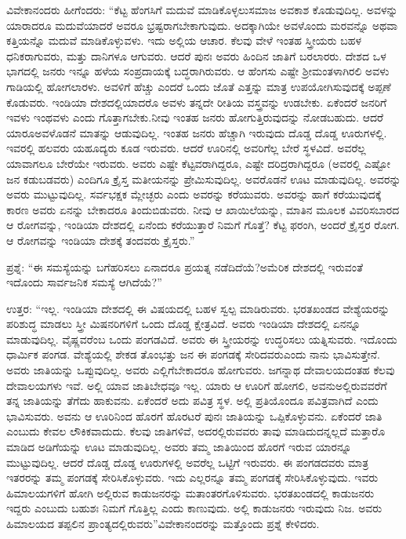 ವಿವೇಕಾನಂದರು ಹೀಗೆಂದರು: “ಕೆಟ್ಟ ಹೆಂಗಸಿಗೆ ಮದುವೆ ಮಾಡಿಕೊಳ್ಳಲು\break ಸಮಾಜ ಅವಕಾಶ ಕೊಡುವುದಿಲ್ಲ. ಅವಳನ್ನು ಯಾರಾದರೂ ಮದುವೆಯಾದರೆ ಅವರೂ ಭ್ರಷ್ಟರಾಗಬೇಕಾಗುವುದು. ಅದಕ್ಕಾಗಿಯೇ ಅವಳೊಂದು ಮರವನ್ನೊ ಅಥವಾ ಕತ್ತಿಯನ್ನೊ ಮದುವೆ ಮಾಡಿಕೊಳ್ಳುವಳು. ಇದು ಅಲ್ಲಿಯ ಆಚಾರ. ಕೆಲವು ವೇಳೆ ಇಂತಹ ಸ್ತ್ರೀಯರು ಬಹಳ ಧನಿಕರಾಗುವರು, ಮತ್ತು ದಾನಿಗಳೂ ಆಗುವರು. ಆದರೆ ಪುನಃ ಅವರು ಹಿಂದಿನ ಜಾತಿಗೆ ಬರಲಾರರು. ದೇಶದ ಒಳ ಭಾಗದಲ್ಲಿ ಜನರು ಇನ್ನೂ ಹಳೆಯ ಸಂಪ್ರದಾಯಕ್ಕೆ ಬದ್ಧರಾಗಿರುವರು. ಆ ಹೆಂಗಸು ಎಷ್ಟೇ ಶ‍್ರೀಮಂತಳಾಗಿರಲಿ ಅವಳು ಗಾಡಿಯಲ್ಲಿ ಹೋಗಲಾರಳು. ಅವಳಿಗೆ ಹೆಚ್ಚು ಎಂದರೆ ಒಂದು ಜೊತೆ ಎತ್ತನ್ನು ಮಾತ್ರ ಉಪಯೋಗಿಸುವುದಕ್ಕೆ ಅಪ್ಪಣೆ ಕೊಡುವರು. ಇಂಡಿಯಾ ದೇಶದಲ್ಲಿಯಾದರೊ ಅವಳು ತನ್ನದೇ ರೀತಿಯ ವಸ್ತ್ರವನ್ನು ಉಡಬೇಕು. ಏಕೆಂದರೆ ಜನರಿಗೆ ಇವಳು ಇಂಥವಳು ಎಂದು ಗೊತ್ತಾಗಬೇಕು.\break ನೀವು ಇಂತಹ ಜನರು ಹೋಗುತ್ತಿರುವುದನ್ನು ನೋಡಬಹುದು. ಆದರೆ ಯಾರೂ\break ಅವಳೊಡನೆ ಮಾತನ್ನು ಆಡುವುದಿಲ್ಲ. ಇಂತಹ ಜನರು ಹೆಚ್ಚಾಗಿ ಇರುವುದು ದೊಡ್ಡ ದೊಡ್ಡ ಊರುಗಳಲ್ಲಿ. ಇವರಲ್ಲಿ ಹಲವರು ಯಹೂದ್ಯರು ಕೂಡ ಇರುವರು. ಆದರೆ ಊರಿನಲ್ಲಿ ಅವರಿಗೆಲ್ಲ ಬೇರೆ ಸ್ಥಳವಿದೆ. ಅವರೆಲ್ಲ ಯಾವಾಗಲೂ ಬೇರೆಯೇ ಇರುವರು. ಅವರು ಎಷ್ಟೇ ಕೆಟ್ಟವರಾಗಿದ್ದರೂ, ಎಷ್ಟೇ ದರಿದ್ರರಾಗಿದ್ದರೂ (ಅವರಲ್ಲಿ ಎಷ್ಟೋ ಜನ ಕಡುಬಡವರು) ಎಂದಿಗೂ ಕ್ರೈಸ್ತ ಮತೀಯನನ್ನು ಪ್ರೇಮಿಸುವುದಿಲ್ಲ. ಅವರೊಡನೆ ಊಟ ಮಾಡುವುದಿಲ್ಲ. ಅವರನ್ನು ಅವರು ಮುಟ್ಟುವುದಿಲ್ಲ. ಸರ್ವಭಕ್ಷಕ ಮ್ಲೇಚ್ಛರು ಎಂದು ಅವರನ್ನು ಕರೆಯುವರು. ಅವರನ್ನು ಹಾಗೆ ಕರೆಯುವುದಕ್ಕೆ ಕಾರಣ ಅವರು ಏನನ್ನು ಬೇಕಾದರೂ ತಿಂದುಬಿಡುವರು. ನೀವು ಆ ಖಾಯಿಲೆಯನ್ನು, ಮಾತಿನ ಮೂಲಕ ವಿವರಿಸಬಾರದ ಆ ರೋಗವನ್ನು, ಇಂಡಿಯಾ ದೇಶದಲ್ಲಿ ಏನೆಂದು ಕರೆಯುತ್ತಾರೆ ನಿಮಗೆ ಗೊತ್ತೆ? ಕೆಟ್ಟ ಫರಂಗಿ, ಅಂದರೆ ಕ್ರೈಸ್ತರ ರೋಗ. ಆ ರೋಗವನ್ನು ಇಂಡಿಯಾ ದೇಶಕ್ಕೆ ತಂದವರು ಕ್ರೈಸ್ತರು.”

\vskip 3pt

ಪ್ರಶ್ನೆ: “ಈ ಸಮಸ್ಯೆಯನ್ನು ಬಗೆಹರಿಸಲು ಏನಾದರೂ ಪ್ರಯತ್ನ ನಡೆದಿದೆಯೆ?\break ಅಮೆರಿಕ ದೇಶದಲ್ಲಿ ಇರುವಂತೆ ಇದೊಂದು ಸಾರ್ವಜನಿಕ ಸಮಸ್ಯೆ ಆಗಿದೆಯೆ?”

\vskip 3pt

ಉತ್ತರ: “ಇಲ್ಲ. ಇಂಡಿಯಾ ದೇಶದಲ್ಲಿ ಈ ವಿಷಯದಲ್ಲಿ ಬಹಳ ಸ್ವಲ್ಪ ಮಾಡಿರುವರು. ಭರತಖಂಡದ ವೇಶ್ಯೆಯರನ್ನು ಪರಿಶುದ್ಧ ಮಾಡಲು ಸ್ತ್ರೀ ಮಿಷನರಿಗಳಿಗೆ ಒಂದು ದೊಡ್ಡ ಕ್ಷೇತ್ರವಿದೆ. ಅವರು ಇಂಡಿಯಾ ದೇಶದಲ್ಲಿ ಏನನ್ನೂ ಮಾಡುವುದಿಲ್ಲ. ವೈಷ್ಣವರೆಂಬ ಒಂದು ಪಂಗಡವಿದೆ. ಅವರು ಈ ಸ್ತ್ರೀಯರನ್ನು ಉದ್ಧರಿಸಲು ಯತ್ನಿಸುವರು. ಇದೊಂದು ಧಾರ್ಮಿಕ ಪಂಗಡ. ವೇಶ್ಯೆಯಲ್ಲಿ ಶೇಕಡ ತೊಂಭತ್ತು ಜನ ಈ ಪಂಗಡಕ್ಕೆ ಸೇರಿದವರು\break ಎಂದು ನಾನು ಭಾವಿಸುತ್ತೇನೆ. ಅವರು ಜಾತಿಯನ್ನು ಒಪ್ಪುವುದಿಲ್ಲ. ಅವರು ಎಲ್ಲಿಗೆ\break ಬೇಕಾದರೂ ಹೋಗುವರು. ಜಗನ್ನಾಥ ದೇವಾಲಯದಂತಹ ಕೆಲವು ದೇವಾಲಯಗಳು ಇವೆ. ಅಲ್ಲಿ ಯಾವ ಜಾತಿಬೇಧವೂ ಇಲ್ಲ. ಯಾರು ಆ ಊರಿಗೆ ಹೋಗಲಿ, ಅವನು\break ಅಲ್ಲಿರುವವರೆಗೆ ತನ್ನ ಜಾತಿಯನ್ನು ತೆಗೆದು ಹಾಕುವನು. ಏಕೆಂದರೆ ಅದು ಪವಿತ್ರ ಸ್ಥಳ. ಅಲ್ಲಿ ಪ್ರತಿಯೊಂದೂ ಪವಿತ್ರವಾಗಿದೆ ಎಂದು ಭಾವಿಸುವರು. ಅವನು ಆ ಊರಿನಿಂದ ಹೊರಗೆ ಹೊರಟರೆ ಪುನಃ ಜಾತಿಯನ್ನು ಒಪ್ಪಿಕೊಳ್ಳುವನು. ಏಕೆಂದರೆ ಜಾತಿ ಎಂಬುದು ಕೇವಲ ಲೌಕಿಕವಾದುದು. ಕೆಲವು ಜಾತಿಗಳಿವೆ, ಅದರಲ್ಲಿರುವವರು ತಾವು ಮಾಡಿದುದನ್ನಲ್ಲದೆ ಮತ್ತಾರೊ ಮಾಡಿದ ಅಡಿಗೆಯನ್ನು ಊಟ ಮಾಡುವುದಿಲ್ಲ. ಅವರು ತಮ್ಮ ಜಾತಿಯಿಂದ ಹೊರಗೆ ಇರುವ ಯಾರನ್ನೂ ಮುಟ್ಟುವುದಿಲ್ಲ. ಆದರೆ ದೊಡ್ಡ ದೊಡ್ಡ ಊರುಗಳಲ್ಲಿ ಅವರೆಲ್ಲ ಒಟ್ಟಿಗೆ ಇರುವರು. ಈ ಪಂಗಡದವರು ಮಾತ್ರ ಇತರರನ್ನು ತಮ್ಮ ಪಂಗಡಕ್ಕೆ ಸೇರಿಸಿಕೊಳ್ಳುವರು. ಇದು ಎಲ್ಲರನ್ನೂ ತಮ್ಮ ಪಂಗಡಕ್ಕೆ ಸೇರಿಸಿಕೊಳ್ಳುವುದು. ಇವರು ಹಿಮಾಲಯಗಳಿಗೆ ಹೋಗಿ ಅಲ್ಲಿರುವ ಕಾಡುಜನರನ್ನು ಮತಾಂತರಗೊಳಿಸುವರು. ಭರತಖಂಡದಲ್ಲಿ ಕಾಡುಜನರು ಇದ್ದರು ಎಂಬುದು ಬಹುಶಃ ನಿಮಗೆ ಗೊತ್ತಿಲ್ಲ ಎಂದು ಕಾಣುವುದು. ಅಲ್ಲಿ ಕಾಡುಜನರು ಇರುವುದು ನಿಜ. ಅವರು ಹಿಮಾಲಯದ ತಪ್ಪಲಿನ ಪ್ರಾಂತ್ಯದಲ್ಲಿರುವರು”\break ವಿವೇಕಾನಂದರನ್ನು ಮತ್ತೊಂದು ಪ್ರಶ್ನೆ ಕೇಳಿದರು.

